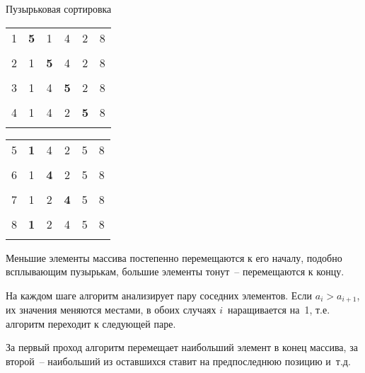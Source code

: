 \documentclass[landscape]{slides}
\begin{document}
\begin{slide}
  Пузырьковая сортировка
  \begin{center}
    \renewcommand{\b}[1]{\textbf{#1}}
    \begin{tabular}{l|c|c|c|c|c|}
      \hhline{~|-----}
      1&	\b{5}&  1&      4&      2&      8\\
      \hhline{~|-----}
      \multicolumn{6}{r}{}\\
      \hhline{~|-----}
      2&        1&      \b{5}&  4&      2&      8\\
      \hhline{~|-----}
      \multicolumn{6}{r}{}\\
      \hhline{~|-----}
      3&	1&      4&      \b{5}&  2&      8\\
      \hhline{~|-----}
      \multicolumn{6}{r}{}\\
      \hhline{~|-----}
      4&	1&      4&      2&      \b{5}&  8\\
      \hhline{~|-----}
    \end{tabular}
    \qquad
    \begin{tabular}{l|c|c|c|c|c|}
      \hhline{~|-----}
      5&	\b{1}&  4&      2&      5&      8\\
      \hhline{~|-----}
      \multicolumn{6}{r}{}\\
      \hhline{~|-----}
      6&        1&      \b{4}&  2&      5&      8\\
      \hhline{~|-----}
      \multicolumn{6}{r}{}\\
      \hhline{~|-----}
      7&        1&      2&      \b{4}&  5&      8\\
      \hhline{~|-----}
      \multicolumn{6}{r}{}\\
      \hhline{~|-----}
      8&        \b{1}&  2&      4&      5&      8\\
      \hhline{~|-----}
    \end{tabular}
  \end{center}
  Меньшие элементы массива постепенно перемещаются к его началу, подобно всплывающим пузырькам, большие элементы тонут~--
  перемещаются к концу.

  На каждом шаге алгоритм анализирует пару соседних элементов. Если $a_i>a_{i+1}$, их значения меняются местами, в обоих случаях
  $i$~наращивается на~1, т.е. алгоритм переходит к следующей паре.

  За первый проход алгоритм перемещает наибольший элемент в конец массива, за второй~-- наибольший из оставшихся ставит на
  предпоследнюю позицию и~т.д.
\end{slide}
\end{document}
